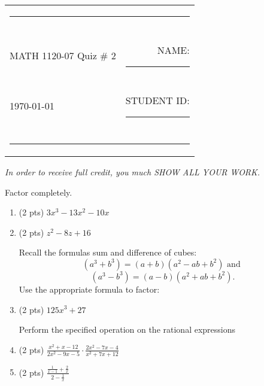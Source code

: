 \documentclass[11pt]{article}
\begin{document}
\begin{tabular*}{7in}{lr}
\multicolumn {2}{c}{\rule{7in}{2pt}} \\
\\
MATH 1120-07 Quiz \# 2 & NAME: \rule{2in}{1pt} \\
\\
\today & STUDENT ID: \rule{2in}{1pt} \\
\\
\multicolumn {2}{c}{\rule{7in}{2pt}} 
\end{tabular*}

\begin{center}
	\emph{In order to receive full credit, you much SHOW ALL YOUR WORK.}
\end{center}

Factor completely.

\begin{enumerate}
\item (2 pts) $3x^3-13x^2-10x$ 
\vspace{1in}

\item (2 pts) $ z^2-8z+16 $
\vspace{1in}

Recall the formulas sum and difference of cubes: 
\[(a^3+b^3) = (a+b)(a^2-ab+b^2) \mbox{ and } \]
\[(a^3-b^3) = (a-b)(a^2+ab+b^2).\]
Use the appropriate formula to factor:
\item (2 pts) $125x^3 + 27$
\vspace{1in}

Perform the specified operation on the rational expressions

\item (2 pts) $\displaystyle \frac{x^2+x-12}{2x^2-9x-5} \cdot \frac{2x^2-7x-4}{x^2+7x+12}  $
\vspace{1in}
\item (2 pts) $\displaystyle  \frac{\frac{1}{x-1} + \frac{2}{x}}{2-\frac{1}{x}}  $

\end{enumerate}
\end{document}
